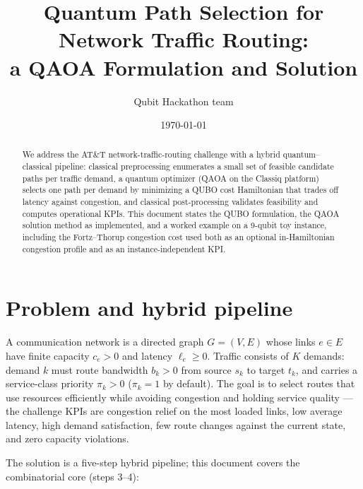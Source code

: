 \documentclass[11pt]{article}
\title{Quantum Path Selection for Network Traffic Routing:\\
a QAOA Formulation and Solution}
\author{Qubit Hackathon team}
\date{\today}
\begin{document}
\maketitle

\begin{abstract}
We address the AT\&T network-traffic-routing challenge with a hybrid
quantum--classical pipeline: classical preprocessing enumerates a small set of
feasible candidate paths per traffic demand, a quantum optimizer (QAOA on the
Classiq platform) selects one path per demand by minimizing a QUBO cost
Hamiltonian that trades off latency against congestion, and classical
post-processing validates feasibility and computes operational KPIs. This
document states the QUBO formulation, the QAOA solution method as implemented,
and a worked example on a 9-qubit toy instance, including the
Fortz--Thorup congestion cost \cite{fortz2000} used both as an optional
in-Hamiltonian congestion profile and as an instance-independent KPI.
\end{abstract}

\section{Problem and hybrid pipeline}
\label{sec:problem}

A communication network is a directed graph $G=(V,E)$ whose links $e \in E$
have finite capacity $c_e > 0$ and latency $\ell_e \ge 0$. Traffic consists of
$K$ demands: demand $k$ must route bandwidth $b_k > 0$ from source $s_k$ to
target $t_k$, and carries a service-class priority $\pi_k > 0$ ($\pi_k = 1$ by
default). The goal is to select routes that use resources efficiently
while avoiding congestion and holding service quality --- the challenge KPIs
are congestion relief on the most loaded links, low average latency, high
demand satisfaction, few route changes against the current state, and zero
capacity violations.

The solution is a five-step hybrid pipeline; this document covers the
combinatorial core (steps 3--4):
\end{document}
